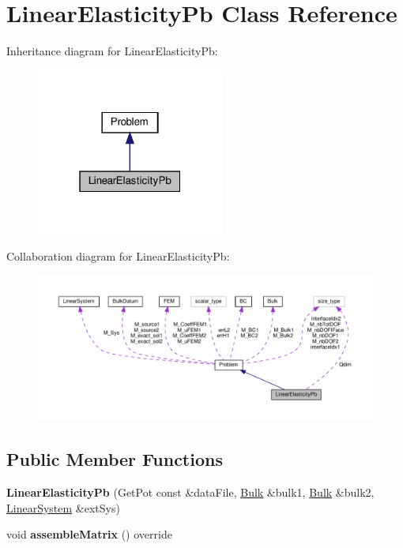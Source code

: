 \hypertarget{classLinearElasticityPb}{}\section{Linear\+Elasticity\+Pb Class Reference}
\label{classLinearElasticityPb}


Inheritance diagram for Linear\+Elasticity\+Pb\+:
\nopagebreak
\begin{figure}[H]
\begin{center}
\leavevmode
\includegraphics[width=175pt]{classLinearElasticityPb__inherit__graph}
\end{center}
\end{figure}


Collaboration diagram for Linear\+Elasticity\+Pb\+:
\nopagebreak
\begin{figure}[H]
\begin{center}
\leavevmode
\includegraphics[width=350pt]{classLinearElasticityPb__coll__graph}
\end{center}
\end{figure}
\subsection*{Public Member Functions}
\begin{DoxyCompactItemize}
\item 
\mbox{\label{classLinearElasticityPb_af8d7c56431cbf30079030183f2c77009}} 
{\bfseries Linear\+Elasticity\+Pb} (Get\+Pot const \&data\+File, \hyperlink{classBulk}{Bulk} \&bulk1, \hyperlink{classBulk}{Bulk} \&bulk2, \hyperlink{classLinearSystem}{Linear\+System} \&ext\+Sys)
\item 
\mbox{\label{classLinearElasticityPb_a354738a6947854e0d64685cc8fe86fdf}} 
void {\bfseries assemble\+Matrix} () override
\end{DoxyCompactItemize}
